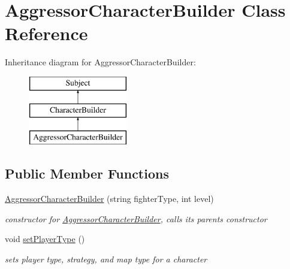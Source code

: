 \hypertarget{class_aggressor_character_builder}{}\section{Aggressor\+Character\+Builder Class Reference}
\label{class_aggressor_character_builder}
Inheritance diagram for Aggressor\+Character\+Builder\+:\begin{figure}[H]
\begin{center}
\leavevmode
\includegraphics[height=3.000000cm]{class_aggressor_character_builder}
\end{center}
\end{figure}
\subsection*{Public Member Functions}
\begin{DoxyCompactItemize}
\item 
\hypertarget{class_aggressor_character_builder_a46abe6152818b2b7a74b143691c484da}{}\label{class_aggressor_character_builder_a46abe6152818b2b7a74b143691c484da} 
\hyperlink{class_aggressor_character_builder_a46abe6152818b2b7a74b143691c484da}{Aggressor\+Character\+Builder} (string fighter\+Type, int level)
\begin{DoxyCompactList}\small\item\em constructor for \hyperlink{class_aggressor_character_builder}{Aggressor\+Character\+Builder}, calls its parents constructor \end{DoxyCompactList}\item 
\hypertarget{class_aggressor_character_builder_af01dff47633bb04aa77e6db3547dc619}{}\label{class_aggressor_character_builder_af01dff47633bb04aa77e6db3547dc619} 
void \hyperlink{class_aggressor_character_builder_af01dff47633bb04aa77e6db3547dc619}{set\+Player\+Type} ()
\begin{DoxyCompactList}\small\item\em sets player type, strategy, and map type for a character \end{DoxyCompactList}\end{DoxyCompactItemize}
